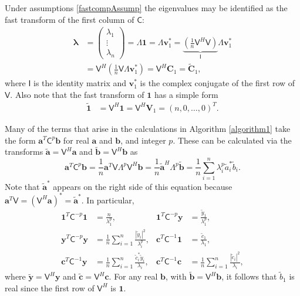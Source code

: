 \documentclass[twocolumn]{svjour3}          %
\newcommand{\bm}[1]{\boldsymbol{#1}}
\newcommand{\vlambda}{{\bm{\lambda}}}
\newcommand{\va}{\bm{a}}
\newcommand{\vb}{\bm{b}}
\newcommand{\vc}{\bm{c}}
\newcommand{\vC}{\bm{C}}
\newcommand{\vv}{\bm{v}}
\newcommand{\vV}{\bm{V}}
\newcommand{\vy}{\bm{y}}
\newcommand{\vone}{\bm{1}}
\newcommand{\mC}{\mathsf{C}}
\newcommand{\mCInv}{\mathsf{C}^{-1}}
\newcommand{\mLambda}{\mathsf{\Lambda}}
\newcommand{\mV}{\mathsf{V}}
\def\abs#1{\ensuremath{\left \lvert #1 \right \rvert}}
\begin{document}
Under assumptions \eqref{fastcompAssump} the eigenvalues may be identified as the fast transform of the first column of $\mC$:
\begin{align}
\nonumber
\vlambda 
& = \begin{pmatrix}
\lambda_1 \\ \vdots \\ \lambda_n
\end{pmatrix} = \mLambda \vone = \mLambda \vv_1^* 
= \underbrace{\left( \frac 1n \mV^H  \mV \right) }_{\mathsf{I}} \mLambda \vv_1^* \\
&= \mV^H \left( \frac 1n \mV \mLambda \vv_1^* \right)
= \mV^H \vC_1 =  \widetilde{\vC}_1,
\label{eqn:fast_transform_to_eigvalues}
\end{align}
where $\mathsf{I}$ is the identity matrix and $\vv_1^*$ is the complex conjugate of the first row of $\mV$.
Also note that the fast transform of $\vone$ has a simple form
\begin{align*} 
\widetilde{\vone}
& = \mV^H \vone = \mV^H \vV_1 = 
\left(n, 0, \dots, 0 \right)^T.
\label{eqn:fast_transform_one}
\end{align*}

Many of the terms that arise in the calculations in  Algorithm \ref{algorithm1} take the form $\va^T\mC^{p}\vb$ for real $\va$ and $\vb$, and integer $p$.  These can be calculated via the transforms $\widetilde{\va} = \mV^H \va$ and $\widetilde{\vb} = \mV^H \vb$ as 
\begin{equation*}
\va^T\mC^p\vb = \frac 1n \va^T \mV \mLambda^p \mV^H \vb
= \frac 1n \widetilde{\va}^H\mLambda^p \widetilde{\vb}
= \frac 1n \sum_{i=1}^n \lambda_i^p \widetilde{a}_i^* \widetilde{b}_i.
\end{equation*}
Note that $\widetilde{\va}^*$ appears on the right side of this equation because $\va^T \mV = (\mV^H \va)^* = \widetilde{\va}^*$.  In particular,
\begin{align*}
\vone^T\mC^{-p}\vone & = \frac{n}{\lambda_1^p},
&
\vone^T\mC^{-p}\vy &= \frac{\widetilde{y}_1}{\lambda_1^p},
\\
\vy^T\mC^{-p} \vy &= \frac 1n \sum_{i=1}^n \frac{\abs{\widetilde{y}_i}^2}{\lambda_i^p},
&
\vc^T\mCInv \vone &= \frac{\widetilde{c}_1}{\lambda_1},\\
\vc^T\mCInv \vy &= \frac 1n \sum_{i=1}^n \frac{\widetilde{c}_i^* \widetilde{y}_i}{\lambda_i}, & 
\vc^T\mCInv \vc &= \frac 1n \sum_{i=1}^n \frac{\abs{\widetilde{c}_i}^2}{\lambda_i},
\end{align*}
where $\widetilde{\vy} = \mV^H \vy$ and 
$\widetilde{\vc} = \mV^H \vc$.  For any real $\vb$, with $\widetilde{\vb} = \mV^H\vb$, it follows that $\widetilde{b}_1$ is real since the first row of $\mV^H$ is $\vone$.
\end{document}
